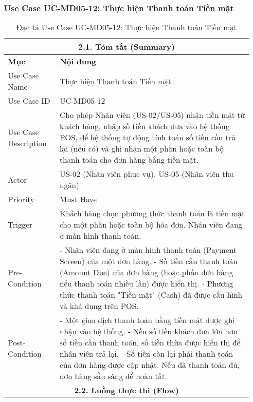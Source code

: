\subsubsection{Use Case UC-MD05-12: Thực hiện Thanh toán Tiền mặt}
\begin{longtable}{|m{4cm}|p{11cm}|}
\caption{Đặc tả Use Case UC-MD05-12: Thực hiện Thanh toán Tiền mặt} \label{tab:uc_md05_12_final} \\
\hline
\multicolumn{2}{|c|}{\textbf{2.1. Tóm tắt (Summary)}} \\
\hline
\textbf{Mục} & \textbf{Nội dung} \\
\hline
\endhead %
\hline
\endfoot %
\hline
\endlastfoot %
Use Case Name & Thực hiện Thanh toán Tiền mặt \\
\hline
Use Case ID & UC-MD05-12 \\
\hline
Use Case Description & Cho phép Nhân viên (US-02/US-05) nhận tiền mặt từ khách hàng, nhập số tiền khách đưa vào hệ thống POS, để hệ thống tự động tính toán số tiền cần trả lại (nếu có) và ghi nhận một phần hoặc toàn bộ thanh toán cho đơn hàng bằng tiền mặt. \\
\hline
Actor & US-02 (Nhân viên phục vụ), US-05 (Nhân viên thu ngân) \\
\hline
Priority & Must Have \\
\hline
Trigger & Khách hàng chọn phương thức thanh toán là tiền mặt cho một phần hoặc toàn bộ hóa đơn. Nhân viên đang ở màn hình thanh toán. \\
\hline
Pre-Condition & - Nhân viên đang ở màn hình thanh toán (Payment Screen) của một đơn hàng. \newline - Số tiền cần thanh toán (Amount Due) của đơn hàng (hoặc phần đơn hàng nếu thanh toán nhiều lần) được hiển thị. \newline - Phương thức thanh toán "Tiền mặt" (Cash) đã được cấu hình và khả dụng trên POS. \\
\hline
Post-Condition & - Một giao dịch thanh toán bằng tiền mặt được ghi nhận vào hệ thống. \newline - Nếu số tiền khách đưa lớn hơn số tiền cần thanh toán, số tiền thừa được hiển thị để nhân viên trả lại. \newline - Số tiền còn lại phải thanh toán của đơn hàng được cập nhật. Nếu đã thanh toán đủ, đơn hàng sẵn sàng để hoàn tất. \\
\hline
\multicolumn{2}{|c|}{\textbf{2.2. Luồng thực thi (Flow)}} \\
\hline

\end{longtable}
